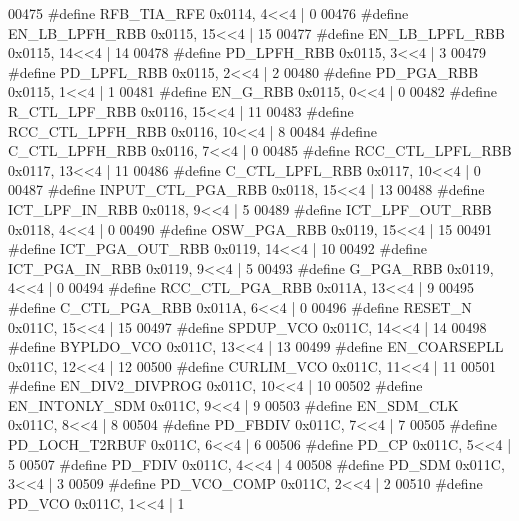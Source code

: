 \begin{DoxyCode}
00475 \textcolor{preprocessor}{#define RFB\_TIA\_RFE 0x0114, 4<<4 |  0}
00476 \textcolor{preprocessor}{#define EN\_LB\_LPFH\_RBB 0x0115, 15<<4 |  15}
00477 \textcolor{preprocessor}{#define EN\_LB\_LPFL\_RBB 0x0115, 14<<4 |  14}
00478 \textcolor{preprocessor}{#define PD\_LPFH\_RBB 0x0115, 3<<4 |  3}
00479 \textcolor{preprocessor}{#define PD\_LPFL\_RBB 0x0115, 2<<4 |  2}
00480 \textcolor{preprocessor}{#define PD\_PGA\_RBB 0x0115, 1<<4 |  1}
00481 \textcolor{preprocessor}{#define EN\_G\_RBB 0x0115, 0<<4 |  0}
00482 \textcolor{preprocessor}{#define R\_CTL\_LPF\_RBB 0x0116, 15<<4 |  11}
00483 \textcolor{preprocessor}{#define RCC\_CTL\_LPFH\_RBB 0x0116, 10<<4 |  8}
00484 \textcolor{preprocessor}{#define C\_CTL\_LPFH\_RBB 0x0116, 7<<4 |  0}
00485 \textcolor{preprocessor}{#define RCC\_CTL\_LPFL\_RBB 0x0117, 13<<4 |  11}
00486 \textcolor{preprocessor}{#define C\_CTL\_LPFL\_RBB 0x0117, 10<<4 |  0}
00487 \textcolor{preprocessor}{#define INPUT\_CTL\_PGA\_RBB 0x0118, 15<<4 |  13}
00488 \textcolor{preprocessor}{#define ICT\_LPF\_IN\_RBB 0x0118, 9<<4 |  5}
00489 \textcolor{preprocessor}{#define ICT\_LPF\_OUT\_RBB 0x0118, 4<<4 |  0}
00490 \textcolor{preprocessor}{#define OSW\_PGA\_RBB 0x0119, 15<<4 |  15}
00491 \textcolor{preprocessor}{#define ICT\_PGA\_OUT\_RBB 0x0119, 14<<4 |  10}
00492 \textcolor{preprocessor}{#define ICT\_PGA\_IN\_RBB 0x0119, 9<<4 |  5}
00493 \textcolor{preprocessor}{#define G\_PGA\_RBB 0x0119, 4<<4 |  0}
00494 \textcolor{preprocessor}{#define RCC\_CTL\_PGA\_RBB 0x011A, 13<<4 |  9}
00495 \textcolor{preprocessor}{#define C\_CTL\_PGA\_RBB 0x011A, 6<<4 |  0}
00496 \textcolor{preprocessor}{#define RESET\_N 0x011C, 15<<4 |  15}
00497 \textcolor{preprocessor}{#define SPDUP\_VCO 0x011C, 14<<4 |  14}
00498 \textcolor{preprocessor}{#define BYPLDO\_VCO 0x011C, 13<<4 |  13}
00499 \textcolor{preprocessor}{#define EN\_COARSEPLL 0x011C, 12<<4 |  12}
00500 \textcolor{preprocessor}{#define CURLIM\_VCO 0x011C, 11<<4 |  11}
00501 \textcolor{preprocessor}{#define EN\_DIV2\_DIVPROG 0x011C, 10<<4 |  10}
00502 \textcolor{preprocessor}{#define EN\_INTONLY\_SDM 0x011C, 9<<4 |  9}
00503 \textcolor{preprocessor}{#define EN\_SDM\_CLK 0x011C, 8<<4 |  8}
00504 \textcolor{preprocessor}{#define PD\_FBDIV 0x011C, 7<<4 |  7}
00505 \textcolor{preprocessor}{#define PD\_LOCH\_T2RBUF 0x011C, 6<<4 |  6}
00506 \textcolor{preprocessor}{#define PD\_CP 0x011C, 5<<4 |  5}
00507 \textcolor{preprocessor}{#define PD\_FDIV 0x011C, 4<<4 |  4}
00508 \textcolor{preprocessor}{#define PD\_SDM 0x011C, 3<<4 |  3}
00509 \textcolor{preprocessor}{#define PD\_VCO\_COMP 0x011C, 2<<4 |  2}
00510 \textcolor{preprocessor}{#define PD\_VCO 0x011C, 1<<4 |  1}

\end{DoxyCode}
